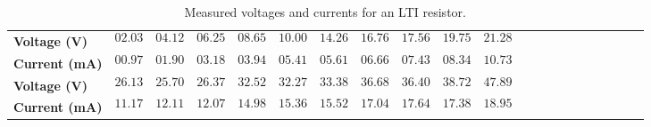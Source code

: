 \documentclass[11pt]{article}
\begin{document}

\begin{question}


    \begin{table}[H]
        \centering
        \begin{tabular}{l c c c c c c c c c c c c c c c c c c c c}
            \toprule
            \textbf{Voltage (V)}  &
            $$02.03$$             &
            $$04.12$$             &
            $$06.25$$             &
            $$08.65$$             &
            $$10.00$$             &
            $$14.26$$             &
            $$16.76$$             &
            $$17.56$$             &
            $$19.75$$             &
            $$21.28$$               \\
            \textbf{Current (mA)} &
            $$00.97$$             &
            $$01.90$$             &
            $$03.18$$             &
            $$03.94$$             &
            $$05.41$$             &
            $$05.61$$             &
            $$06.66$$             &
            $$07.43$$             &
            $$08.34$$             &
            $$10.73$$               \\
            \bottomrule
            \toprule
            \textbf{Voltage (V)}  &
            $$26.13$$             &
            $$25.70$$             &
            $$26.37$$             &
            $$32.52$$             &
            $$32.27$$             &
            $$33.38$$             &
            $$36.68$$             &
            $$36.40$$             &
            $$38.72$$             &
            $$47.89$$               \\
            \textbf{Current (mA)} &
            $$11.17$$             &
            $$12.11$$             &
            $$12.07$$             &
            $$14.98$$             &
            $$15.36$$             &
            $$15.52$$             &
            $$17.04$$             &
            $$17.64$$             &
            $$17.38$$             &
            $$18.95$$               \\
            \bottomrule
        \end{tabular}
        \caption{Measured voltages and currents for an LTI resistor.}\label{tab:Q1}
    \end{table}


\end{question}
\end{document}
